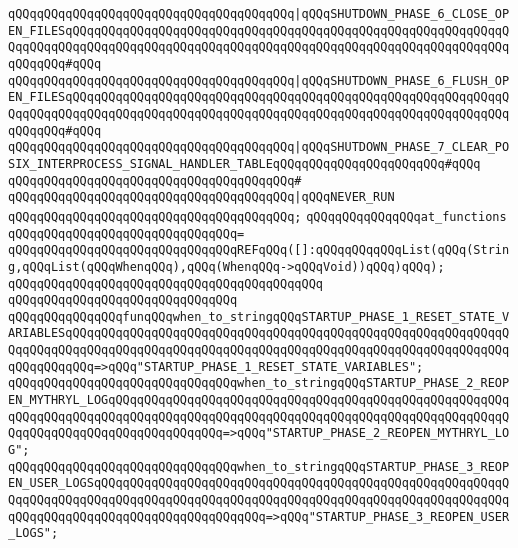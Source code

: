 \verb|qQQqqQQqqQQqqQQqqQQqqQQqqQQqqQQqqQQqqQQq|\verb#|qQQqSHUTDOWN_PHASE_6_CLOSE_OPEN_FILESqQQqqQQqqQQqqQQqqQQqqQQqqQQqqQQqqQQqqQQqqQQqqQQqqQQqqQQqqQQqqQQqqQQqqQQqqQQqqQQqqQQqqQQqqQQqqQQqqQQqqQQqqQQqqQQqqQQqqQQqqQQqqQQqqQQqqQQqqQQq#\verb|#qQQq|\newline
\verb|qQQqqQQqqQQqqQQqqQQqqQQqqQQqqQQqqQQqqQQq|\verb#|qQQqSHUTDOWN_PHASE_6_FLUSH_OPEN_FILESqQQqqQQqqQQqqQQqqQQqqQQqqQQqqQQqqQQqqQQqqQQqqQQqqQQqqQQqqQQqqQQqqQQqqQQqqQQqqQQqqQQqqQQqqQQqqQQqqQQqqQQqqQQqqQQqqQQqqQQqqQQqqQQqqQQqqQQqqQQq#\verb|#qQQq|\newline
\verb|qQQqqQQqqQQqqQQqqQQqqQQqqQQqqQQqqQQqqQQq|\verb#|qQQqSHUTDOWN_PHASE_7_CLEAR_POSIX_INTERPROCESS_SIGNAL_HANDLER_TABLEqQQqqQQqqQQqqQQqqQQqqQQq#\verb|#qQQq|\newline
\verb|qQQqqQQqqQQqqQQqqQQqqQQqqQQqqQQqqQQqqQQq#|\newline
\verb|qQQqqQQqqQQqqQQqqQQqqQQqqQQqqQQqqQQqqQQq|\verb#|qQQqNEVER_RUN#\newline
\verb|qQQqqQQqqQQqqQQqqQQqqQQqqQQqqQQqqQQqqQQq;|\newline
\newline
\verb|qQQqqQQqqQQqqQQqat_functions|\newline
\verb|qQQqqQQqqQQqqQQqqQQqqQQqqQQqqQQq=|\newline
\verb|qQQqqQQqqQQqqQQqqQQqqQQqqQQqqQQqREFqQQq([]:qQQqqQQqqQQqList(qQQq(String,qQQqList(qQQqWhenqQQq),qQQq(WhenqQQq->qQQqVoid))qQQq)qQQq);|\newline
\newline
\newline
\verb|qQQqqQQqqQQqqQQqqQQqqQQqqQQqqQQqqQQqqQQqqQQq|\newline
\verb|qQQqqQQqqQQqqQQqqQQqqQQqqQQqqQQq|\newline
\verb|qQQqqQQqqQQqqQQqfunqQQqwhen_to_stringqQQqSTARTUP_PHASE_1_RESET_STATE_VARIABLESqQQqqQQqqQQqqQQqqQQqqQQqqQQqqQQqqQQqqQQqqQQqqQQqqQQqqQQqqQQqqQQqqQQqqQQqqQQqqQQqqQQqqQQqqQQqqQQqqQQqqQQqqQQqqQQqqQQqqQQqqQQqqQQqqQQqqQQqqQQqqQQq=>qQQq"STARTUP_PHASE_1_RESET_STATE_VARIABLES";|\newline
\verb|qQQqqQQqqQQqqQQqqQQqqQQqqQQqqQQqwhen_to_stringqQQqSTARTUP_PHASE_2_REOPEN_MYTHRYL_LOGqQQqqQQqqQQqqQQqqQQqqQQqqQQqqQQqqQQqqQQqqQQqqQQqqQQqqQQqqQQqqQQqqQQqqQQqqQQqqQQqqQQqqQQqqQQqqQQqqQQqqQQqqQQqqQQqqQQqqQQqqQQqqQQqqQQqqQQqqQQqqQQqqQQqqQQqqQQq=>qQQq"STARTUP_PHASE_2_REOPEN_MYTHRYL_LOG";|\newline
\verb|qQQqqQQqqQQqqQQqqQQqqQQqqQQqqQQqwhen_to_stringqQQqSTARTUP_PHASE_3_REOPEN_USER_LOGSqQQqqQQqqQQqqQQqqQQqqQQqqQQqqQQqqQQqqQQqqQQqqQQqqQQqqQQqqQQqqQQqqQQqqQQqqQQqqQQqqQQqqQQqqQQqqQQqqQQqqQQqqQQqqQQqqQQqqQQqqQQqqQQqqQQqqQQqqQQqqQQqqQQqqQQqqQQqqQQqqQQq=>qQQq"STARTUP_PHASE_3_REOPEN_USER_LOGS";|\newline

